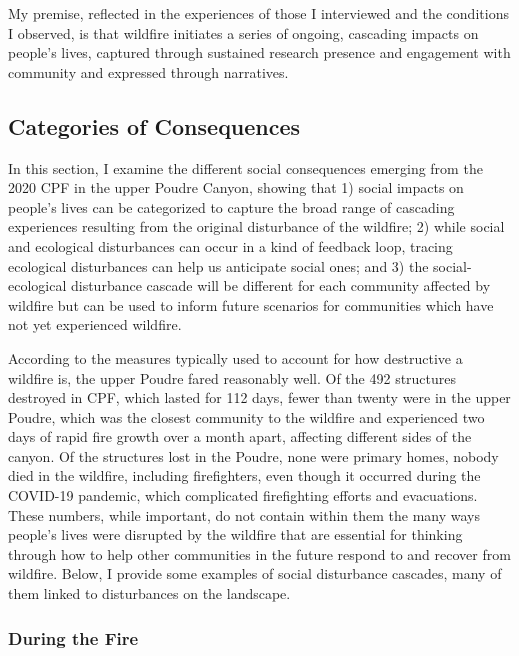 \documentclass[
]{article}
\begin{document}
My premise, reflected in the experiences of those I interviewed and the conditions I observed, is that wildfire initiates a series of ongoing, cascading impacts on people's lives, captured through sustained research presence and engagement with community and expressed through narratives.

\subsection{Categories of Consequences}\label{categories-of-consequences}

In this section, I examine the different social consequences emerging from the 2020 CPF in the upper Poudre Canyon, showing that 1) social impacts on people's lives can be categorized to capture the broad range of cascading experiences resulting from the original disturbance of the wildfire; 2) while social and ecological disturbances can occur in a kind of feedback loop, tracing ecological disturbances can help us anticipate social ones; and 3) the social-ecological disturbance cascade will be different for each community affected by wildfire but can be used to inform future scenarios for communities which have not yet experienced wildfire.

According to the measures typically used to account for how destructive a wildfire is, the upper Poudre fared reasonably well. Of the 492 structures destroyed in CPF, which lasted for 112 days, fewer than twenty were in the upper Poudre, which was the closest community to the wildfire and experienced two days of rapid fire growth over a month apart, affecting different sides of the canyon. Of the structures lost in the Poudre, none were primary homes, nobody died in the wildfire, including firefighters, even though it occurred during the COVID-19 pandemic, which complicated firefighting efforts and evacuations. These numbers, while important, do not contain within them the many ways people's lives were disrupted by the wildfire that are essential for thinking through how to help other communities in the future respond to and recover from wildfire. Below, I provide some examples of social disturbance cascades, many of them linked to disturbances on the landscape.

\subsubsection{During the Fire}\label{during-the-fire}
\end{document}
